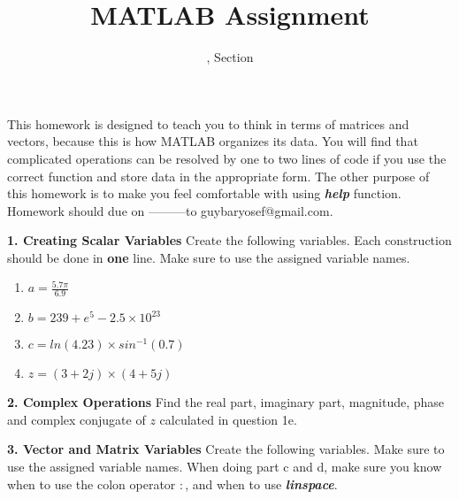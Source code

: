 \documentclass[11pt]{article}
\title{MATLAB Assignment \Homework}
\author{\Session, Section \Section}
\date{}
\makeatletter
\def\MyEmail{guybaryosef@gmail.com}
\def\DateOfSubmission{---------}
\newenvironment{qparts}{\begin{enumerate}[{(}a{)}]}{\end{enumerate}}
\makeatother
\begin{document}
\maketitle

This homework is designed to teach you to think in terms of matrices and vectors,
because this is how MATLAB organizes its data.
You will find that complicated operations can be resolved by one to two lines of
code if you use the correct function and store data in the appropriate form.
The other purpose of this homework is to make you feel comfortable with 
using \textbf{\textit{help}} function.
Homework should due on \DateOfSubmission to \MyEmail. 

\noindent \textbf{1. Creating Scalar Variables} Create the following variables. 
Each construction should be done in \textbf{one} line. 
Make sure to use the assigned variable names. 

\begin{qparts}
\item
$ a = \frac{5.7 \pi}{6.9} $
\item 
$ b = 239+e^5 - 2.5 \times 10^{23}$
\item
$ c = ln(4.23) \times sin^{-1}(0.7)$
\item 
$ z = (3+2j) \times (4+5j) $
\end{qparts}

\noindent \textbf{2. Complex Operations} Find the real part, imaginary part, magnitude,
phase and complex conjugate of $z$ calculated in question 1e.

\noindent \textbf{3. Vector and Matrix Variables} Create the following variables.
Make sure to use the assigned variable names.
When doing part c and d, make sure you know when to use the colon operator $:$,
and when to use \textbf{\textit{linspace}}. 
\end{document}
